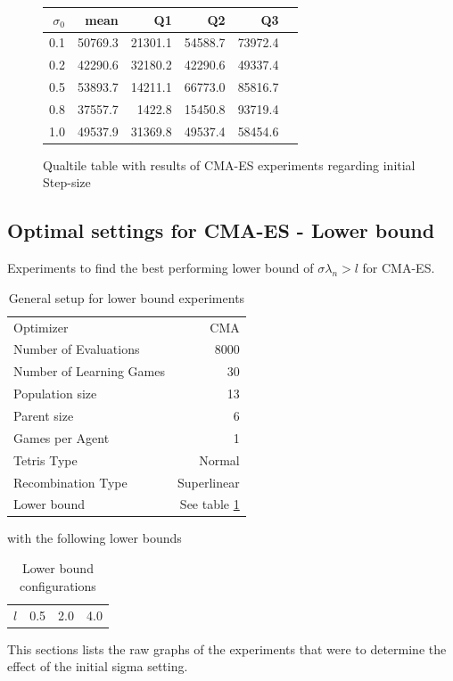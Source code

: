 \begin{figure}[H]
\centering
\begin{tabular}{r | r r r r r}
$\sigma_0$ & mean & Q1 & Q2 & Q3\\
\hline
0.1 & 50769.3 & 21301.1 & 54588.7 & 73972.4\\
0.2 & 42290.6 & 32180.2 & 42290.6 & 49337.4\\
0.5 & 53893.7 & 14211.1 & 66773.0 & 85816.7\\
0.8 & 37557.7 & 1422.8  & 15450.8 & 93719.4\\
1.0 & 49537.9 & 31369.8 & 49537.4 & 58454.6
\end{tabular}
\caption{Qualtile table with results of CMA-ES experiments regarding initial Step-size \label{CMAInitialSigmaConfigTestAppendix}}
\end{figure}


\clearpage

\subsection{Optimal settings for CMA-ES - Lower bound \label{appendixCMALowerBound}}
Experiments to find the best performing lower bound of $\sigma \lambda_n > l$ for CMA-ES.

\begin{table}[h]
\centering
\begin{tabular}{l r}
Optimizer & CMA\\
Number of Evaluations & 8000\\
Number of Learning Games &30\\
Population size& 13\\
Parent size & 6\\
Games per Agent & 1\\
Tetris Type & Normal\\
\hline
Recombination Type & Superlinear\\
Lower bound & See table \ref{appendixLowerBound}
\end{tabular}
\caption{General setup for lower bound experiments}
\end{table}

with the following lower bounds

\begin{table}[H]
\centering
\begin{tabular}{c | c c c}
$l$ & 0.5 & 2.0 & 4.0
\end{tabular}
\caption{Lower bound configurations \label{appendixLowerBound}}
\end{table}
This sections lists the raw graphs of the experiments that were
to determine the effect of the initial sigma setting. 

